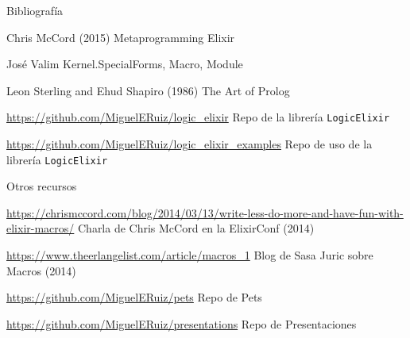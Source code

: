 \documentclass[14pt,aspectratio=169]{beamer}
\begin{document}
\begin{frame}{Bibliografía}
  \begin{thebibliography}{99} %
     Chris McCord (2015)
    \newblock Metaprogramming Elixir
  \end{thebibliography}
  \begin{thebibliography}{99} %
     José Valim
    \newblock Kernel.SpecialForms, Macro, Module
  \end{thebibliography}
  \begin{thebibliography}{99}
     Leon Sterling and Ehud Shapiro (1986)
    \newblock The Art of Prolog
  \end{thebibliography}
  \begin{thebibliography}{99}
     \url{https://github.com/MiguelERuiz/logic\_elixir}
    \newblock Repo de la librería \texttt{LogicElixir}
  \end{thebibliography}
  \begin{thebibliography}{99}
     \url{https://github.com/MiguelERuiz/logic\_elixir\_examples}
    \newblock Repo de uso de la librería \texttt{LogicElixir}
  \end{thebibliography}
\end{frame}

\begin{frame}{Otros recursos}
    \begin{thebibliography}{99}
         \url{https://chrismccord.com/blog/2014/03/13/write-less-do-more-and-have-fun-with-elixir-macros/}
        \newblock Charla de Chris McCord en la ElixirConf (2014)
    \end{thebibliography}
    \begin{thebibliography}{99}
         \url{https://www.theerlangelist.com/article/macros_1}
        \newblock Blog de Sasa Juric sobre Macros (2014)
    \end{thebibliography}
    \begin{thebibliography}{99}
         \url{https://github.com/MiguelERuiz/pets}
        \newblock Repo de Pets
    \end{thebibliography}
    \begin{thebibliography}{99}
         \url{https://github.com/MiguelERuiz/presentations}
        \newblock Repo de Presentaciones
    \end{thebibliography}
\end{frame}
\end{document}
